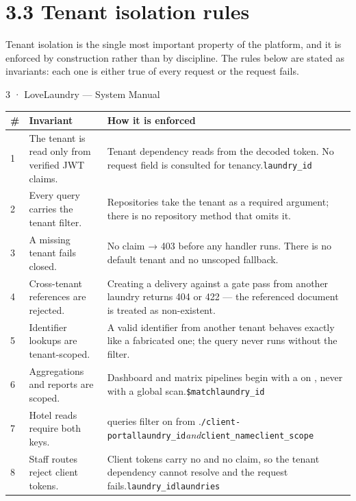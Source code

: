 \documentclass[11pt,a4paper,oneside]{book}
\begin{document}
\section{3.3 Tenant isolation rules}
Tenant isolation is the single most important property of the platform, and it is enforced by construction rather than by discipline. The rules below are stated as invariants: each one is either true of every request or the request fails.

3 · LoveLaundry — System Manual

\begin{center}\small
\begin{tabularx}{\linewidth}{|X|X|X|}
\hline
\rowcolor{lightgrey}
\textbf{\#} & \textbf{Invariant} & \textbf{How it is enforced} \\ \hline
1 & The tenant is read only from verified JWT claims. & Tenant dependency reads  from the decoded token. No request field is consulted for tenancy.\texttt{laundry\_id} \\ \hline
2 & Every query carries the tenant filter. & Repositories take the tenant as a required argument; there is no repository method that omits it. \\ \hline
3 & A missing tenant fails closed. & No claim → 403 before any handler runs. There is no default tenant and no unscoped fallback. \\ \hline
4 & Cross-tenant references are rejected. & Creating a delivery against a gate pass from another laundry returns 404 or 422 — the referenced document is treated as non-existent. \\ \hline
5 & Identifier lookups are tenant-scoped. & A valid identifier from another tenant behaves exactly like a fabricated one; the query never runs without the filter. \\ \hline
6 & Aggregations and reports are scoped. & Dashboard and matrix pipelines begin with a  on , never with a global scan.\texttt{\$match}\texttt{laundry\_id} \\ \hline
7 & Hotel reads require both keys. & queries filter on    from .\texttt{/client-portal}\texttt{laundry\_id}\emph{and}\texttt{client\_name}\texttt{client\_scope} \\ \hline
8 & Staff routes reject client tokens. & Client tokens carry no  and no  claim, so the tenant dependency cannot resolve and the request fails.\texttt{laundry\_id}\texttt{laundries} \\ \hline
\end{tabularx}
\end{center}
\end{document}
